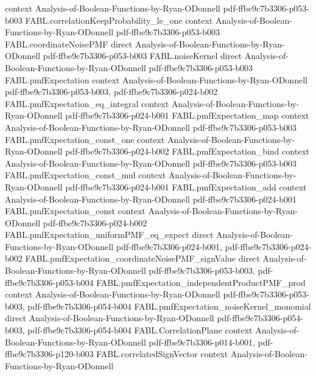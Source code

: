 \begin{theorem}
  {context}
  {Analysis-of-Boolean-Functions-by-Ryan-ODonnell}
  {pdf-ffbe9c7b3306-p053-b003}
\proofstep
  {FABL.correlationKeepProbability_le_one}
  {context}
  {Analysis-of-Boolean-Functions-by-Ryan-ODonnell}
  {pdf-ffbe9c7b3306-p053-b003}
\proofstep
  {FABL.coordinateNoisePMF}
  {direct}
  {Analysis-of-Boolean-Functions-by-Ryan-ODonnell}
  {pdf-ffbe9c7b3306-p053-b003}
\proofstep
  {FABL.noiseKernel}
  {direct}
  {Analysis-of-Boolean-Functions-by-Ryan-ODonnell}
  {pdf-ffbe9c7b3306-p053-b003}
\proofstep
  {FABL.pmfExpectation}
  {context}
  {Analysis-of-Boolean-Functions-by-Ryan-ODonnell}
  {pdf-ffbe9c7b3306-p053-b003,
    pdf-ffbe9c7b3306-p024-b002}
\proofstep
  {FABL.pmfExpectation_eq_integral}
  {context}
  {Analysis-of-Boolean-Functions-by-Ryan-ODonnell}
  {pdf-ffbe9c7b3306-p024-b001}
\proofstep
  {FABL.pmfExpectation_map}
  {context}
  {Analysis-of-Boolean-Functions-by-Ryan-ODonnell}
  {pdf-ffbe9c7b3306-p053-b003}
\proofstep
  {FABL.pmfExpectation_const_one}
  {context}
  {Analysis-of-Boolean-Functions-by-Ryan-ODonnell}
  {pdf-ffbe9c7b3306-p024-b002}
\proofstep
  {FABL.pmfExpectation_bind}
  {context}
  {Analysis-of-Boolean-Functions-by-Ryan-ODonnell}
  {pdf-ffbe9c7b3306-p053-b003}
\proofstep
  {FABL.pmfExpectation_const_mul}
  {context}
  {Analysis-of-Boolean-Functions-by-Ryan-ODonnell}
  {pdf-ffbe9c7b3306-p024-b001}
\proofstep
  {FABL.pmfExpectation_add}
  {context}
  {Analysis-of-Boolean-Functions-by-Ryan-ODonnell}
  {pdf-ffbe9c7b3306-p024-b001}
\proofstep
  {FABL.pmfExpectation_const}
  {context}
  {Analysis-of-Boolean-Functions-by-Ryan-ODonnell}
  {pdf-ffbe9c7b3306-p024-b002}
\proofstep
  {FABL.pmfExpectation_uniformPMF_eq_expect}
  {direct}
  {Analysis-of-Boolean-Functions-by-Ryan-ODonnell}
  {pdf-ffbe9c7b3306-p024-b001,
    pdf-ffbe9c7b3306-p024-b002}
\proofstep
  {FABL.pmfExpectation_coordinateNoisePMF_signValue}
  {direct}
  {Analysis-of-Boolean-Functions-by-Ryan-ODonnell}
  {pdf-ffbe9c7b3306-p053-b003,
    pdf-ffbe9c7b3306-p053-b004}
\proofstep
  {FABL.pmfExpectation_independentProductPMF_prod}
  {context}
  {Analysis-of-Boolean-Functions-by-Ryan-ODonnell}
  {pdf-ffbe9c7b3306-p053-b003,
    pdf-ffbe9c7b3306-p054-b004}
\proofstep
  {FABL.pmfExpectation_noiseKernel_monomial}
  {direct}
  {Analysis-of-Boolean-Functions-by-Ryan-ODonnell}
  {pdf-ffbe9c7b3306-p054-b003,
    pdf-ffbe9c7b3306-p054-b004}
\proofstep
  {FABL.CorrelationPlane}
  {context}
  {Analysis-of-Boolean-Functions-by-Ryan-ODonnell}
  {pdf-ffbe9c7b3306-p014-b001,
    pdf-ffbe9c7b3306-p120-b003}
\proofstep
  {FABL.correlatedSignVector}
  {context}
  {Analysis-of-Boolean-Functions-by-Ryan-ODonnell}

\end{theorem}
